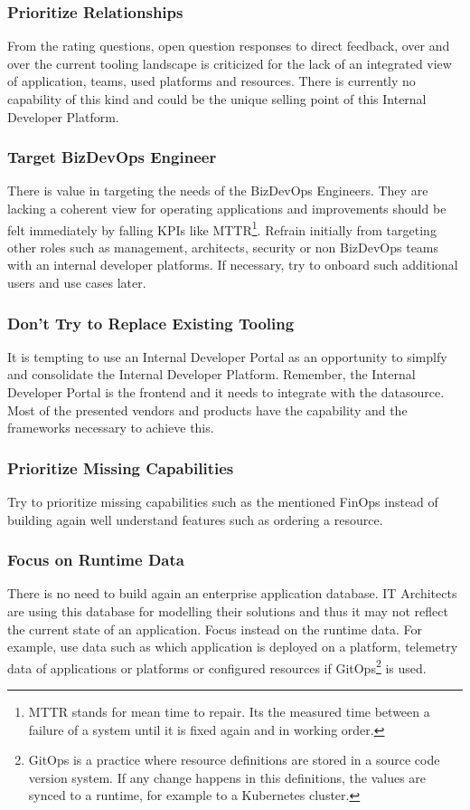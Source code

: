 \documentclass[a4paper,12pt]{article}
\begin{document}
    \subsubsection{Prioritize Relationships}
    From the rating questions, open question responses to direct feedback, over and over the current tooling landscape is
    criticized for the lack of an integrated view of application, teams, used platforms and resources.
    There is currently no capability of this kind and could be the unique selling point of this Internal Developer Platform.
    \subsubsection{Target BizDevOps Engineer}
    There is value in targeting the needs of the BizDevOps Engineers.
    They are lacking a coherent view for operating applications and improvements should be felt immediately by falling
    KPIs like MTTR\footnote{MTTR stands for mean time to repair. Its the measured time between a failure of a system
    until it is fixed again and in working order.}.
    Refrain initially from targeting other roles such as management, architects, security or non BizDevOps teams with
    an internal developer platforms.
    If necessary, try to onboard such additional users and use cases later.
    \subsubsection{Don't Try to Replace Existing Tooling}
    It is tempting to use an Internal Developer Portal as an opportunity to simplfy and consolidate the Internal
    Developer Platform.
    Remember, the Internal Developer Portal is the frontend and it needs to integrate with the datasource.
    Most of the presented vendors and products have the capability and the frameworks necessary to achieve this.
    \subsubsection{Prioritize Missing Capabilities}
    Try to prioritize missing capabilities such as the mentioned FinOps instead of building again well understand
    features such as ordering a resource.
    \subsubsection{Focus on Runtime Data}
    There is no need to build again an enterprise application database.
    IT Architects are using this database for modelling their solutions and thus it may not reflect the current state of an application.
    Focus instead on the runtime data.
    For example, use data such as which application is deployed on a platform, telemetry data of applications or platforms or
    configured resources if GitOps\footnote{
        GitOps is a practice where resource definitions are stored in a source code version system. If any change
        happens in this definitions, the values are synced to a runtime, for example to a Kubernetes cluster.} is used.
\end{document}
